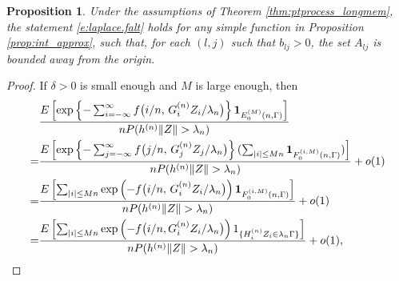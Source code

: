 \documentclass[11pt,reqno]{amsart}
\numberwithin{equation}{section}
\newtheorem{proposition}{Proposition}
\theoremstyle{definition}
\theoremstyle{remark}
\theoremstyle{definition}
\newcommand{\one}{{\bf 1}}
\begin{document}
\begin{proposition} \label{pr:pp.step}
Under the assumptions of Theorem \ref{thm:ptprocess_longmem}, the
statement \eqref{e:laplace.falt} holds for any simple function in
Proposition \ref{prop:int_approx}, such that, for
each $(l,j)$ such that $b_{lj}>0$, the set $A_{lj} $ is bounded away
from the origin. 
\end{proposition}
\begin{proof}
If $\delta>0$ is small enough and $M$ is large enough, then 
\begin{align*}
&\frac{E\left[\exp\left\{ -\sum_{i=-\infty}^\infty  f\big(i/n, \, G_i^{(n)}
  Z_i/\lambda_n\big)\right\} \one_{E_0^{(M)}(n,\Gamma)}\right]}
{n P(h^{(n)}\|Z\|>\lambda_n)}\\
= & \frac{E\left[  
\exp\left\{ -\sum_{j=-\infty}^\infty  f\big(j/n, \, G_j^{(n)}
  Z_j/\lambda_n\big)\right\} (\sum_{|i|\leq Mn}\one_{F_0^{(i,M)}(n,\Gamma)})\right]}
    {n P(h^{(n)}\|Z\|>\lambda_n)}  + o(1)\\
=&\frac{E\left[\sum_{|i|\leq Mn}  
\exp\left( -   f\big(i/n, \, G_i^{(n)}
  Z_i/\lambda_n\big)\right) \one_{F_0^{(i,M)}(n,\Gamma)}\right]}
    {n P(h^{(n)}\|Z\|>\lambda_n)} + o(1) \\
 =&\frac{ E \left[\sum_{|i|\leq Mn}\exp\left(-
      f\bigl(i/n, {G_i^{(n)}} Z_i/\lambda_n\bigr)\right)
    1_{\{{H_i^{(n)}}  Z_i\in \lambda_n\Gamma\}}\right] } {n
    P(h^{(n)}\|Z\|>\lambda_n)} +o(1), 
\end{align*}

\end{proof}
\end{document}
